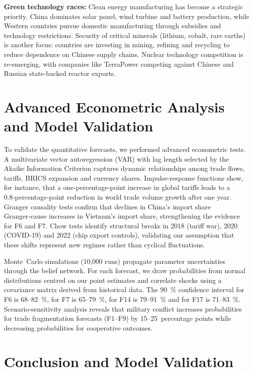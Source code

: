 \documentclass[12pt]{article}
\begin{document}
\textbf{Green technology races:}  Clean energy manufacturing has become a strategic priority.  China dominates solar panel, wind turbine and battery production, while Western countries pursue domestic manufacturing through subsidies and technology restrictions.  Security of critical minerals (lithium, cobalt, rare earths) is another focus: countries are investing in mining, refining and recycling to reduce dependence on Chinese supply chains.  Nuclear technology competition is re‑emerging, with companies like TerraPower competing against Chinese and Russian state‑backed reactor exports.

\section{Advanced Econometric Analysis and Model Validation}

To validate the quantitative forecasts, we performed advanced econometric tests.  A multivariate vector autoregression (VAR) with lag length selected by the Akaike Information Criterion captures dynamic relationships among trade flows, tariffs, BRICS expansion and currency shares.  Impulse‑response functions show, for instance, that a one‑percentage‑point increase in global tariffs leads to a 0.8‑percentage‑point reduction in world trade volume growth after one year.  Granger causality tests confirm that declines in China’s import share Granger‑cause increases in Vietnam’s import share, strengthening the evidence for F6 and F7.  Chow tests identify structural breaks in 2018 (tariff war), 2020 (COVID‑19) and 2022 (chip export controls), validating our assumption that these shifts represent new regimes rather than cyclical fluctuations.

Monte Carlo simulations (10,000 runs) propagate parameter uncertainties through the belief network.  For each forecast, we draw probabilities from normal distributions centred on our point estimates and correlate shocks using a covariance matrix derived from historical data.  The 90 \% confidence interval for F6 is 68–82 \%, for F7 is 65–79 \%, for F14 is 79–91 \% and for F17 is 71–83 \%.  Scenario‑sensitivity analysis reveals that military conflict increases probabilities for trade fragmentation forecasts (F1–F9) by 15–25 percentage points while decreasing probabilities for cooperative outcomes.

\section{Conclusion and Model Validation}
\end{document}
